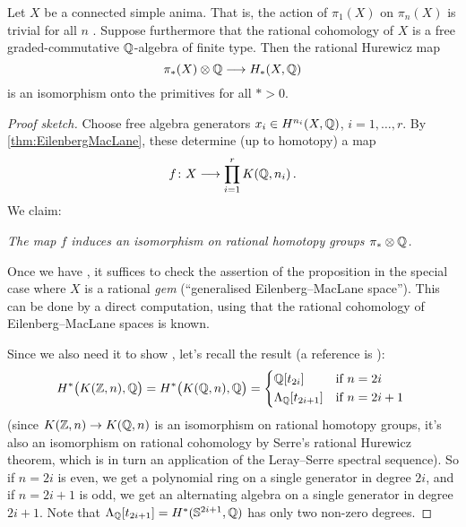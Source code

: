 \begin{prop}\label{prop:CartanSerrePrimitives}
	Let $X$ be a connected simple anima. That is, the action of $\pi_1(X)$ on $\pi_n(X)$ is trivial for all $n$ . Suppose furthermore that the rational cohomology of $X$ is a free graded-commutative $\mathbb{Q}$-algebra of finite type. Then the rational Hurewicz map
	\begin{equation*}
		\pi_*(X)\otimes \IQ\morphism H_*(X,\IQ)
	\end{equation*}
	is an isomorphism onto the primitives for all $*>0$.
\end{prop}
\begin{proof}[Proof sketch]
	Choose free algebra generators $x_i\in H^{n_i}(X,\mathbb{Q})$, $i=1,\dotsc,r$. By \cref{thm:EilenbergMacLane}, these determine (up to homotopy) a map 
	\begin{equation*}
		f\colon X\morphism \prod_{i=1}^r K(\IQ,n_i)\,.
	\end{equation*}
	We claim:
	\begin{alphanumerate}
		\item[\itememph{\boxtimes}] \itshape The map $f$ induces an isomorphism on rational homotopy groups $\pi_*\otimes \mathbb{Q}$.
	\end{alphanumerate}	
	Once we have \itememph{\boxtimes}, it suffices to check the assertion of the proposition in the special case where $X$ is a rational \emph{gem} (\enquote{generalised Eilenberg--MacLane space}). This can be done by a direct computation, using that the rational cohomology of Eilenberg--MacLane spaces is known.
	
	Since we also need it to show \itememph{\boxtimes}, let's recall the result (a reference is \cite[Theorem~(20.7.1)]{TomDieck}): 
	\begin{equation*}
		H^*\big(K(\IZ,n),\IQ\big)=H^*\big(K(\IQ,n),\IQ\big)=\begin{cases*}
			\IQ[t_{2i}] & if $n=2i$\\
			\Lambda_\IQ[t_{2i+1}] & if $n=2i+1$
		\end{cases*}
	\end{equation*}
	(since $K(\IZ,n)\morphism K(\IQ,n)$ is an isomorphism on rational homotopy groups, it's also an isomorphism on rational cohomology by Serre's rational Hurewicz theorem, which is in turn an application of the Leray--Serre spectral sequence). So if $n=2i$ is even, we get a polynomial ring on a single generator in degree $2i$, and if $n=2i+1$ is odd, we get an alternating algebra on a single generator in degree $2i+1$. Note that $\Lambda_{\mathbb{Q}}[t_{2i+1}]=H^*(\mathbb{S}^{2i+1},\mathbb{Q})$ has only two non-zero degrees.
	

\end{proof}
